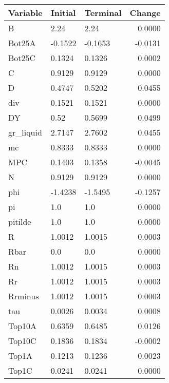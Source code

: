 \begin{table}
\centering
\label{tab:stst_comparison_low_B_limit_permanent_asymmetric}
\begin{tabular}{lllr}
\toprule
                Variable & Initial & Terminal &  Change \\
\midrule
                       B &    2.24 &     2.24 &  0.0000 \\
                  Bot25A & -0.1522 &  -0.1653 & -0.0131 \\
                  Bot25C &  0.1324 &   0.1326 &  0.0002 \\
                       C &  0.9129 &   0.9129 &  0.0000 \\
                       D &  0.4747 &   0.5202 &  0.0455 \\
                     div &  0.1521 &   0.1521 &  0.0000 \\
                      DY &    0.52 &   0.5699 &  0.0499 \\
               gr\_liquid &  2.7147 &   2.7602 &  0.0455 \\
                      mc &  0.8333 &   0.8333 &  0.0000 \\
                     MPC &  0.1403 &   0.1358 & -0.0045 \\
                       N &  0.9129 &   0.9129 &  0.0000 \\
                     phi & -1.4238 &  -1.5495 & -0.1257 \\
                      pi &     1.0 &      1.0 &  0.0000 \\
                 pitilde &     1.0 &      1.0 &  0.0000 \\
                       R &  1.0012 &   1.0015 &  0.0003 \\
                    Rbar &     0.0 &      0.0 &  0.0000 \\
                      Rn &  1.0012 &   1.0015 &  0.0003 \\
                      Rr &  1.0012 &   1.0015 &  0.0003 \\
                 Rrminus &  1.0012 &   1.0015 &  0.0003 \\
                     tau &  0.0026 &   0.0034 &  0.0008 \\
                  Top10A &  0.6359 &   0.6485 &  0.0126 \\
                  Top10C &  0.1836 &   0.1834 & -0.0002 \\
                   Top1A &  0.1213 &   0.1236 &  0.0023 \\
                   Top1C &  0.0241 &   0.0241 &  0.0000 \\

\end{tabular}
\end{table}
